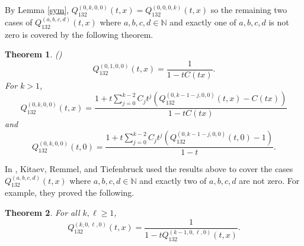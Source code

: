 \documentclass[
final,nomarks
]{dmtcs-episciences}
\newtheorem{theorem}{Theorem}
\begin{document}
By Lemma \ref{sym}, \begin{math}Q_{132}^{(0,k,0,0)}(t,x) =Q_{132}^{(0,0,0,k)}(t,x)\end{math} so the 
remaining two cases of \begin{math}Q_{132}^{(a,b,c,d)}(t,x)\end{math} where \begin{math}a,b,c,d \in \mathbb{N}\end{math} and 
exactly one of \begin{math}a,b,c,d\end{math} is not zero is covered by the following theorem. 

\begin{theorem}\label{thm:Q0k00} (\cite[Theorem 12]{KRT1})
	\begin{equation}\label{Q0100}
	Q_{132}^{(0,1,0,0)}(t,x) = \frac{1}{1-tC(tx)}.
	\end{equation}
	For \begin{math}k > 1\end{math}, 
	\begin{equation}\label{Q0100-}
	Q_{132}^{(0,k,0,0)}(t,x) = \frac{1+t\sum_{j=0}^{k-2} C_j t^j
		(Q_{132}^{(0,k-1-j,0,0)}(t,x) -C(tx))}{1-tC(tx)}
	\end{equation}
	and 
	\begin{equation}\label{x=0Q0100-}
	Q_{132}^{(0,k,0,0)}(t,0) = \frac{1+t\sum_{j=0}^{k-2} C_j t^j
		(Q_{132}^{(0,k-1-j,0,0)}(t,0) -1)}{1-t}.
	\end{equation}
\end{theorem}


In \cite{KRT2}, Kitaev, Remmel, and Tiefenbruck used the results above to cover the cases 
\begin{math}Q_{132}^{(a,b,c,d)}(t,x)\end{math} where \begin{math}a,b,c,d \in \mathbb{N}\end{math} and 
exactly two of \begin{math}a,b,c,d\end{math} are not zero. For example, they proved the following. 


\begin{theorem}\label{thm:Qk0l0} For all \begin{math}k, \ell \geq 1\end{math}, 
	\begin{equation}\label{k0l0gf}
	Q_{132}^{(k,0,\ell,0)}(t,x) = 
	\frac{1}{1-t Q_{132}^{(k-1,0,\ell,0)}(t,x)}.
	\end{equation}
\end{theorem}
\end{document}
